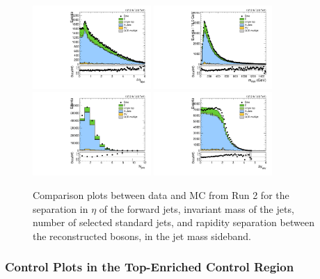 \begin{figure}[htbp]
  \centering
  \includegraphics[width=0.4\textwidth]{fig/analysis/SB_b1_allL_allP_allC_allE_Run2_lnujj_vbfDEta.pdf}
  \includegraphics[width=0.4\textwidth]{fig/analysis/SB_b1_allL_allP_allC_allE_Run2_lnujj_vbfMass.pdf}\\
  \includegraphics[width=0.4\textwidth]{fig/analysis/SB_b1_allL_allP_allC_allE_Run2_lnujj_nJets.pdf}
  \includegraphics[width=0.4\textwidth]{fig/analysis/SB_b1_allL_allP_allC_allE_Run2_dy.pdf}\\
  \caption{
    Comparison plots between data and MC from Run 2 for the separation in $\eta$ of the \VBF forward jets, invariant mass of the \VBF jets, number of selected standard jets, and rapidity separation between the reconstructed bosons, in the jet mass sideband.
  }
  \label{fig:SB_controlPlotsRun2_4}
\end{figure}

\subsubsection{Control Plots in the Top-Enriched Control Region}

